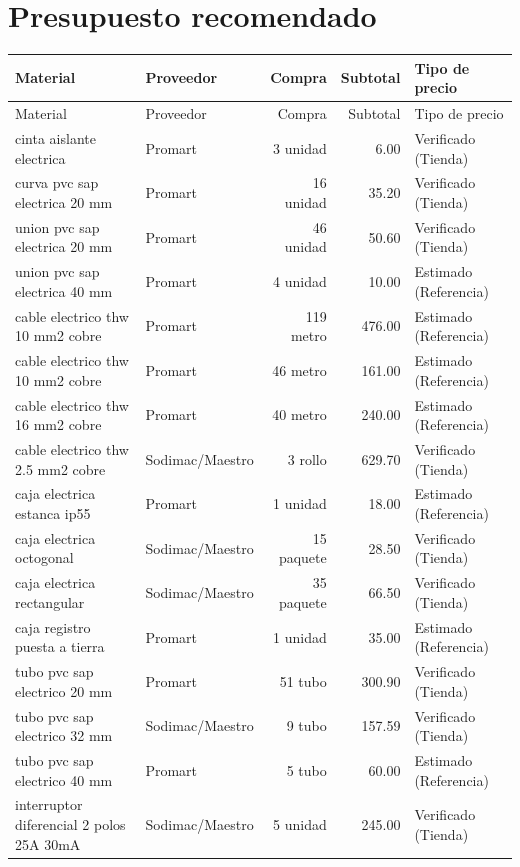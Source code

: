 \section{Presupuesto recomendado}
\scriptsize
\begin{longtable}{p{5.5cm}p{2.5cm}r r p{3.0cm}}
\toprule Material & Proveedor & Compra & Subtotal & Tipo de precio \\ \midrule
\endfirsthead\toprule Material & Proveedor & Compra & Subtotal & Tipo de precio \\ \midrule\endhead
cinta aislante electrica & Promart & 3 unidad & 6.00 & Verificado (Tienda) \\
curva pvc sap electrica 20 mm & Promart & 16 unidad & 35.20 & Verificado (Tienda) \\
union pvc sap electrica 20 mm & Promart & 46 unidad & 50.60 & Verificado (Tienda) \\
union pvc sap electrica 40 mm & Promart & 4 unidad & 10.00 & Estimado (Referencia) \\
cable electrico thw 10 mm2 cobre & Promart & 119 metro & 476.00 & Estimado (Referencia) \\
cable electrico thw 10 mm2 cobre & Promart & 46 metro & 161.00 & Estimado (Referencia) \\
cable electrico thw 16 mm2 cobre & Promart & 40 metro & 240.00 & Estimado (Referencia) \\
cable electrico thw 2.5 mm2 cobre & Sodimac/Maestro & 3 rollo & 629.70 & Verificado (Tienda) \\
caja electrica estanca ip55 & Promart & 1 unidad & 18.00 & Estimado (Referencia) \\
caja electrica octogonal & Sodimac/Maestro & 15 paquete & 28.50 & Verificado (Tienda) \\
caja electrica rectangular & Sodimac/Maestro & 35 paquete & 66.50 & Verificado (Tienda) \\
caja registro puesta a tierra & Promart & 1 unidad & 35.00 & Estimado (Referencia) \\
tubo pvc sap electrico 20 mm & Promart & 51 tubo & 300.90 & Verificado (Tienda) \\
tubo pvc sap electrico 32 mm & Sodimac/Maestro & 9 tubo & 157.59 & Verificado (Tienda) \\
tubo pvc sap electrico 40 mm & Promart & 5 tubo & 60.00 & Estimado (Referencia) \\
interruptor diferencial 2 polos 25A 30mA & Sodimac/Maestro & 5 unidad & 245.00 & Verificado (Tienda) \\

\end{longtable}
